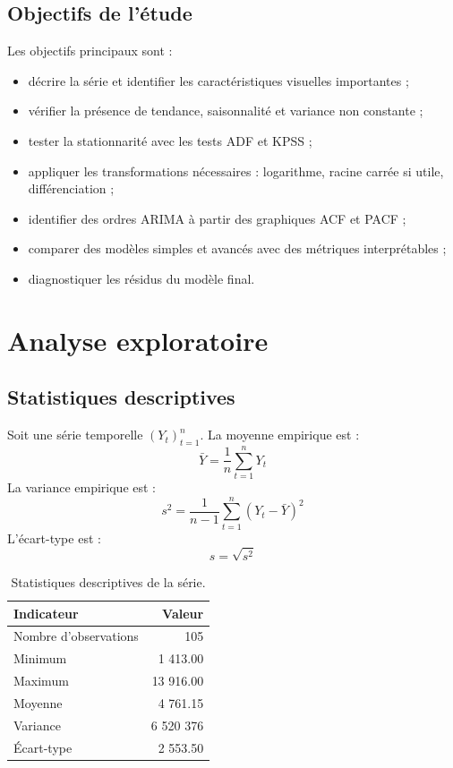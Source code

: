 \documentclass[12pt,a4paper]{report}
\begin{document}
\section{Objectifs de l'étude}
Les objectifs principaux sont :
\begin{itemize}
    \item décrire la série et identifier les caractéristiques visuelles importantes ;
    \item vérifier la présence de tendance, saisonnalité et variance non constante ;
    \item tester la stationnarité avec les tests ADF et KPSS ;
    \item appliquer les transformations nécessaires : logarithme, racine carrée si utile, différenciation ;
    \item identifier des ordres ARIMA à partir des graphiques ACF et PACF ;
    \item comparer des modèles simples et avancés avec des métriques interprétables ;
    \item diagnostiquer les résidus du modèle final.
\end{itemize}

\chapter{Analyse exploratoire}
\section{Statistiques descriptives}
Soit une série temporelle $(Y_t)_{t=1}^n$. La moyenne empirique est :
\[
\bar{Y} = \frac{1}{n}\sum_{t=1}^n Y_t
\]
La variance empirique est :
\[
s^2 = \frac{1}{n-1}\sum_{t=1}^n (Y_t - \bar{Y})^2
\]
L'écart-type est :
\[
s = \sqrt{s^2}
\]

\begin{table}[H]
\centering
\begin{tabular}{lr}
\toprule
Indicateur & Valeur \\
\midrule
Nombre d'observations & 105 \\
Minimum & 1 413.00 \\
Maximum & 13 916.00 \\
Moyenne & 4 761.15 \\
Variance & 6 520 376 \\
Écart-type & 2 553.50 \\
\bottomrule
\end{tabular}
\caption{Statistiques descriptives de la série.}
\end{table}
\end{document}
